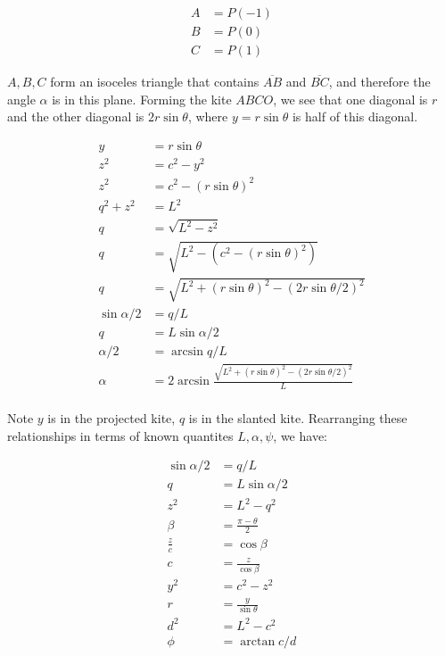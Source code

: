 \documentclass[11pt]{article}
\begin{document}
{\begin{align*}
    A &= P(-1)  \\
    B &= P(0) \\
    C &= P(1)
\end{align*}

$A,B,C$ form an isoceles triangle that contains $\overline{AB}$ and $\overline{BC}$, and therefore the angle $\alpha$ is in
this plane. Forming the kite $ABCO$, we see that one diagonal is $r$ and the other diagonal is $2 r \sin{\theta}$, where
$y = r \sin{\theta}$ is half of this diagonal. 

\begin{align*}
    y &= r \sin{\theta}  \\
    z^2 &= c^2 - y^2 \\
    z^2 &= c^2 - (r \sin{\theta})^2 \\    
    q^2 + z^2 &= L^2 \\
    q &= \sqrt{L^2 - z^2} \\
    q &= \sqrt{L^2 - (c^2- (r\sin{\theta})^2)} \\
    q &= \sqrt{L^2 + (r\sin{\theta})^2 - (2r\sin{\theta/2})^2 } \\        
    \sin{\alpha/2} &= q/L \\
    q &= L \sin{\alpha/2} \\
    \alpha/2 &= \arcsin{q/L} \\
    \alpha &= 2 \arcsin{\frac{\sqrt{L^2 + (r\sin{\theta})^2 -
          (2r\sin{\theta/2})^2}}
      {L}} \\ 
\end{align*}

Note $y$ is in the projected kite, $q$ is in the slanted kite.
Rearranging these relationships in terms of known quantites $L, \alpha, \psi$, we have:

\begin{align*}
  \sin{\alpha/2} &= q/L \\
  q &= L \sin{\alpha/2} \\    
  z^2 &= L^2 - q^2 \\
  \beta &= \frac{\pi - \theta}{2} \\
  \frac{z}{c} &= \cos{\beta} \\
  c &= \frac{z}{\cos{\beta}} \\
  y^2 &= c^2 - z^2 \\
  r &= \frac{y}{\sin{\theta}} \\
  d^2 &= L^2 - c^2 \\
  \phi &= \arctan{c/d} \\
\end{align*}

}
\end{document}
